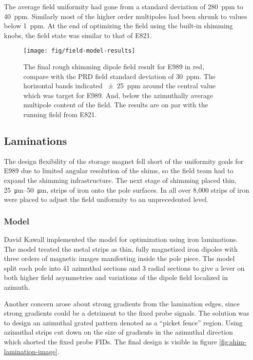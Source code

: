 The average field uniformity had gone from a standard deviation of \SI{280}{ppm} to \SI{40}{ppm}.  Similarly most of the higher order multipoles had been shrunk to values below \SI{1}{ppm}.  At the end of optimizing the field using the built-in shimming knobs, the field state was similar to that of E821.  

\begin{figure}
\centering
\texttt{[image: fig/field-model-results]}
\caption{The final rough shimming dipole field result for E989 in red, compare with the PRD field standard deviation of \SI{30}{ppm}.  The horizontal bands indicated \SI{\pm 25}{ppm} around the central value which was target for E989.  And, below the azimuthally average multipole content of the field.  The results are on par with the running field from E821. \label{fig:field-model-results}}
\end{figure}

\subsection{Laminations}

The design flexibility of the storage magnet fell short of the uniformity goals for E989 due to limited angular resolution of the shims, so the field team had to expand the shimming infrastructure.  The next stage of shimming placed thin, \SIrange{25}{50}{\micro\meter}, strips of iron onto the pole surfaces.  In all over 8,000 strips of iron were placed to adjust the field uniformity to an unprecedented level.

\subsubsection{Model}

David Kawall implemented the model for optimization using iron laminations.  The model treated the metal strips as thin, fully magnetized iron dipoles with three orders of magnetic images manifesting inside the pole piece.  The model split each pole into 41 azimuthal sections and 3 radial sections to give a lever on both higher field asymmetries and variations of the dipole field localized in azimuth.  

Another concern arose about strong gradients from the lamination edges, since strong gradients could be a detriment to the fixed probe signals.  The solution was to design an azimuthal grated pattern denoted as a ``picket fence'' region.  Using azimuthal strips cut down on the size of gradients in the azimuthal direction which shorted the fixed probe FIDs. The final design is visible in figure \ref{fig:shim-lamination-image}.

